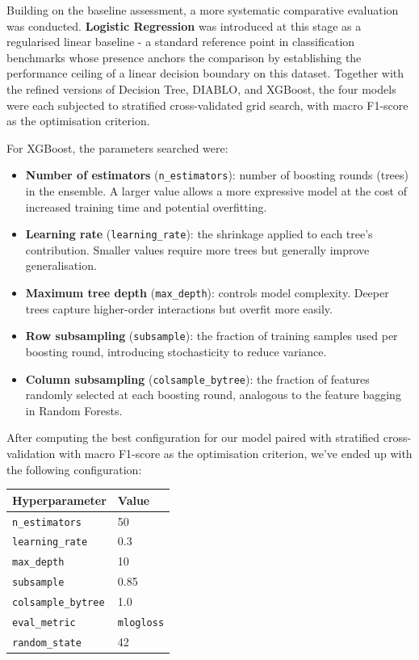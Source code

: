 Building on the baseline assessment, a more systematic comparative 
evaluation was conducted. \textbf{Logistic Regression} was introduced 
at this stage as a regularised linear baseline - a standard reference 
point in classification benchmarks whose presence anchors the comparison 
by establishing the performance ceiling of a linear decision boundary on 
this dataset. Together with the refined versions of Decision Tree, DIABLO, 
and XGBoost, the four models were each subjected to stratified 
cross-validated grid search, with macro F1-score as the optimisation 
criterion.

For XGBoost, the parameters searched were:
\begin{itemize}
    \item \textbf{Number of estimators} (\texttt{n\_estimators}): number of boosting rounds
    (trees) in the ensemble. A larger value allows a more expressive model at the cost of
    increased training time and potential overfitting.

    \item \textbf{Learning rate} (\texttt{learning\_rate}): the shrinkage applied to each
    tree's contribution. Smaller values require more trees but generally improve generalisation.

    \item \textbf{Maximum tree depth} (\texttt{max\_depth}): controls model complexity.
    Deeper trees capture higher-order interactions but overfit more easily.

    \item \textbf{Row subsampling} (\texttt{subsample}): the fraction of training samples
    used per boosting round, introducing stochasticity to reduce variance.

    \item \textbf{Column subsampling} (\texttt{colsample\_bytree}): the fraction of features
    randomly selected at each boosting round, analogous to the feature bagging in Random Forests.
\end{itemize}

After computing the best configuration for our model paired 
with stratified cross-validation with macro F1-score as the optimisation 
criterion, we've ended up with the following configuration:

\begin{center}
\begin{tabular}{ll}
\hline
\textbf{Hyperparameter} & \textbf{Value} \\
\hline
\texttt{n\_estimators}    & 50   \\
\texttt{learning\_rate}   & 0.3  \\
\texttt{max\_depth}       & 10   \\
\texttt{subsample}        & 0.85 \\
\texttt{colsample\_bytree}& 1.0  \\
\texttt{eval\_metric}     & \texttt{mlogloss} \\
\texttt{random\_state}    & 42   \\
\hline
\end{tabular}
\end{center}

